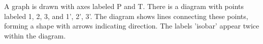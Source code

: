 A graph is drawn with axes labeled P and T. There is a diagram with points labeled 1, 2, 3, and 1', 2', 3'. The diagram shows lines connecting these points, forming a shape with arrows indicating direction. The labels 'isobar' appear twice within the diagram.